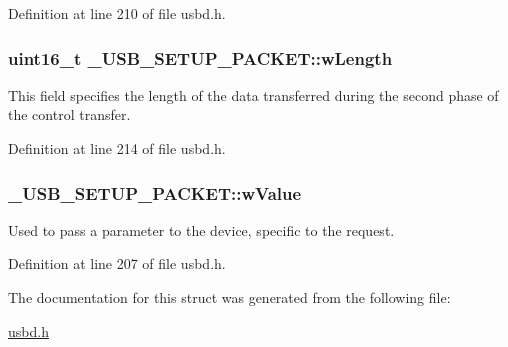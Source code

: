 Definition at line 210 of file usbd.\+h.

\subsubsection[{\texorpdfstring{w\+Length}{wLength}}]{\setlength{\rightskip}{0pt plus 5cm}uint16\+\_\+t \+\_\+\+U\+S\+B\+\_\+\+S\+E\+T\+U\+P\+\_\+\+P\+A\+C\+K\+E\+T\+::w\+Length}\hypertarget{struct__USB__SETUP__PACKET_a2beb83e5854b4a7bc518e5cfbc3f38a6}{}\label{struct__USB__SETUP__PACKET_a2beb83e5854b4a7bc518e5cfbc3f38a6}
This field specifies the length of the data transferred during the second phase of the control transfer. 

Definition at line 214 of file usbd.\+h.

\subsubsection[{\texorpdfstring{w\+Value}{wValue}}]{ \+\_\+\+U\+S\+B\+\_\+\+S\+E\+T\+U\+P\+\_\+\+P\+A\+C\+K\+E\+T\+::w\+Value}\hypertarget{struct__USB__SETUP__PACKET_a790f014cc1dac6148a182b1cbe24bffe}{}\label{struct__USB__SETUP__PACKET_a790f014cc1dac6148a182b1cbe24bffe}
Used to pass a parameter to the device, specific to the request. 

Definition at line 207 of file usbd.\+h.



The documentation for this struct was generated from the following file\+:\begin{DoxyCompactItemize}
\item 
\hyperlink{usbd_8h}{usbd.\+h}\end{DoxyCompactItemize}
